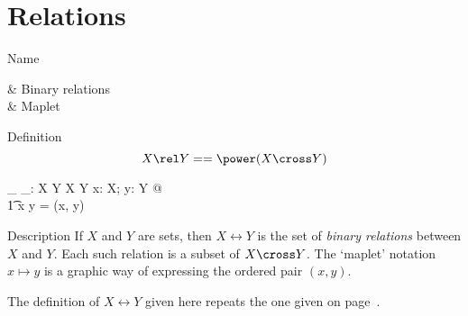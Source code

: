 \section{Relations}\label{s:rellib}
\begin{manpage}\label{p:1010}
\item[Name]
\begin{name}
       \rel & Binary relations\symdex{$\rel$} \\
       \mapsto & Maplet\symdex{$\mapsto$}
\end{name}

\item[Definition]
\[ X \rel Y  ==  \power (X \cross Y) \]
\begin{gendef}[X,Y]
       \_ \mapsto \_: X \cross Y \fun X \cross Y
\where
       \forall x: X; y: Y @ \\
\t1           x \mapsto y = (x, y)
\end{gendef}

\item[Description]
If $X$ and $Y$ are sets, then $X \rel Y$ is the set of {\em binary
relations\/} between $X$ and $Y$. Each such relation is a subset
of $X \cross Y$. The `maplet' notation $x \mapsto y$ is a graphic way
of expressing the ordered pair $(x, y)$.

The definition of $X \rel Y$ given here repeats the one given on
page~\pageref{p:forward}.
\end{manpage}

